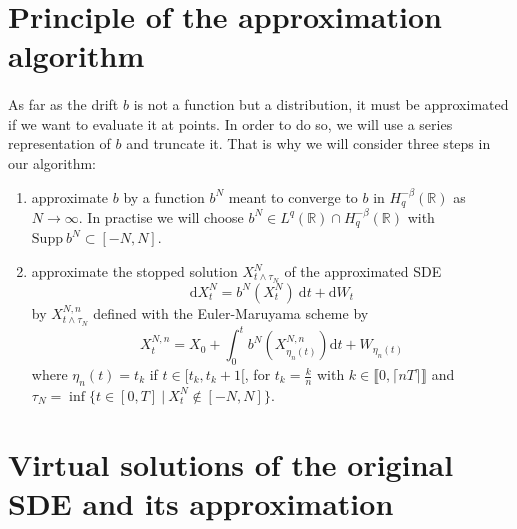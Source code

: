 \documentclass[11pt]{enstaPRE}
\newcommand{\R}{\mathbb{R}}
\newcommand{\di}{\mathrm{d}}
\begin{document}
\section{Principle of the approximation algorithm}
    
    \paragraph{}
    As far as the drift $b$ is not a function but a distribution, it must be approximated if we want to evaluate it at points. In order to do so, we will use a series representation of $b$ and truncate it. That is why we will consider three steps in our algorithm:
     \begin{enumerate}
       \item approximate $b$ by a function $b^N$ meant to converge to $b$ in $H^{-\beta}_q(\R)$ as $N\rightarrow\infty$. In practise we will choose $b^N\in L^q(\R)\cap H^{-\beta}_q(\R)$ with $\mathrm{Supp}\ b^N\subset[-N,N]$.
        \item approximate the stopped solution $X^N_{t\wedge\tau_N}$ of the approximated SDE
       \begin{equation} \label{sde2}
       \di X^N_t = b^N\left(X^N_t\right)\ \di t + \di W_t
        \end{equation} 
        by $X^{N,n}_{t\wedge\tau_N}$ defined with the Euler-Maruyama scheme by
        \begin{equation}\label{euler}
        X^{N,n}_t = X_0 + \int_0^t b^N\left(X^{N,n}_{\eta_n(t)}\right)\di t + W_{\eta_n(t)}
        \end{equation}
        where $\eta_n(t)=t_k$ if $t\in[t_k,t_k+1[$, for $t_k=\frac{k}{n}$ with $ k\in\llbracket0,\lceil nT\rceil\rrbracket$ 
        and $\tau_N = \inf\{t\in[0,T]\ |\ X^N_t\notin[-N,N]\}$.
        
   \end{enumerate}

\section{Virtual solutions of the original SDE and its approximation}
\end{document}
